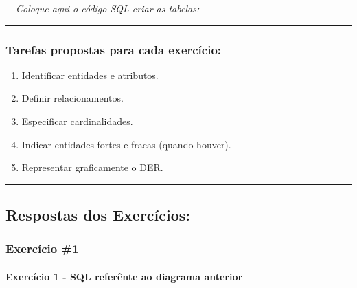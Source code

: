 \documentclass[
]{book}
\newenvironment{Shaded}{\begin{snugshade}}{\end{snugshade}}
\newcommand{\CommentTok}[1]{\textcolor[rgb]{0.56,0.35,0.01}{\textit{#1}}}
\providecommand{\tightlist}{%
  \setlength{\itemsep}{0pt}\setlength{\parskip}{0pt}}
\begin{document}


\begin{Shaded}
\begin{Highlighting}[]
\CommentTok{{-}{-} Coloque aqui o código SQL criar as tabelas:}


\end{Highlighting}
\end{Shaded}

\begin{center}\rule{0.5\linewidth}{0.5pt}\end{center}

\subsubsection{Tarefas propostas para cada exercício:}\label{tarefas-propostas-para-cada-exercuxedcio}

\begin{enumerate}
\def\labelenumi{\arabic{enumi}.}
\tightlist
\item
  Identificar entidades e atributos.\\
\item
  Definir relacionamentos.\\
\item
  Especificar cardinalidades.\\
\item
  Indicar entidades fortes e fracas (quando houver).\\
\item
  Representar graficamente o DER.
\end{enumerate}

\begin{center}\rule{0.5\linewidth}{0.5pt}\end{center}

\subsection{Respostas dos Exercícios:}\label{respostas-dos-exercuxedcios}

\subsubsection{Exercício \#1}\label{exercuxedcio-1}



\paragraph{Exercício 1 - SQL referênte ao diagrama anterior}\label{exercuxedcio-1---sql-referuxeante-ao-diagrama-anterior}
\end{document}
